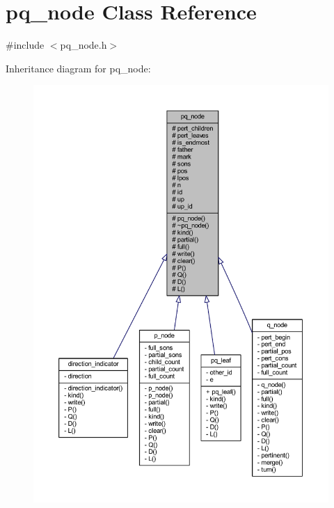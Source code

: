 \hypertarget{classpq__node}{}\section{pq\+\_\+node Class Reference}
\label{classpq__node}


{\ttfamily \#include $<$pq\+\_\+node.\+h$>$}



Inheritance diagram for pq\+\_\+node\+:\nopagebreak
\begin{figure}[H]
\begin{center}
\leavevmode
\includegraphics[width=350pt]{classpq__node__inherit__graph}
\end{center}
\end{figure}


